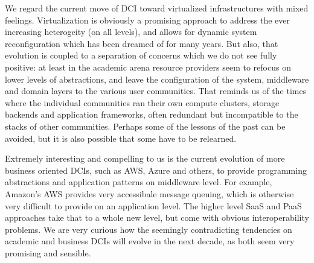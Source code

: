 \documentclass[]{article}
\newcommand{\B}[1]{\textbf{#1}}
\newcommand{\todo}[1]{{\textcolor{red}{\B{TODO:} #1 }}}
\begin{document}
 We regard the current move of DCI toward virtualized infrastructures
 with mixed feelings.  Virtualization is obviously a promising
 approach to address the ever increasing heterogeity (on all levels),
 and allows for dynamic system reconfiguration which has been dreamed
 of for many years.  But also, that evolution is coupled to a
 separation of concerns which we do not see fully positive: at least
 in the academic arena resource providers seem to refocus on lower
 levels of abstractions, and leave the configuration of the system,
 middleware and domain layers to the various user communities.  That
 reminds us of the times where the individual communities ran their
 own compute clusters, storage backends and application frameworks,
 often redundant but incompatible to the stacks of other communities.
 Perhaps some of the lessons of the past can be avoided, but it is
 also possible that some have to be relearned.

 Extremely interesting and compelling to us is the current evolution
 of more business oriented DCIs,  such as AWS, Azure and others, to
 provide programming abstractions and application patterns on
 middleware level.  For example, Amazon's AWS provides very
 accessibale message queuing, which is otherwise very difficult to
 provide on an application level.  The higher level SaaS and PaaS
 approaches take that to a whole new level, but come with obvious
 interoperability problems.  We are very curious how the seemingly
 contradicting tendencies on academic and business DCIs will evolve in
 the next decade, as both seem very promising and sensible.



\end{document}
